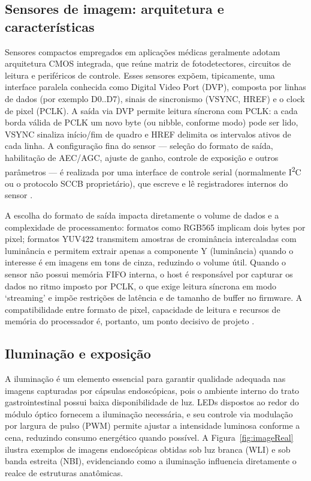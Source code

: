 \documentclass[repeatfields,xlists,xpacks,oneside]{ufrgscca}
\begin{document}
\subsection{Sensores de imagem: arquitetura e características}

Sensores compactos empregados em aplicações médicas geralmente adotam arquitetura CMOS integrada, que reúne matriz de fotodetectores, circuitos de leitura e periféricos de controle. Esses sensores expõem, tipicamente, uma interface paralela conhecida como Digital Video Port (DVP), composta por linhas de dados (por exemplo D0..D7), sinais de sincronismo (VSYNC, HREF) e o clock de pixel (PCLK). A saída via DVP permite leitura síncrona com PCLK: a cada borda válida de PCLK um novo byte (ou nibble, conforme modo) pode ser lido, VSYNC sinaliza início/fim de quadro e HREF delimita os intervalos ativos de cada linha. A configuração fina do sensor — seleção do formato de saída, habilitação de AEC/AGC, ajuste de ganho, controle de exposição e outros parâmetros — é realizada por uma interface de controle serial (normalmente I\textsuperscript{2}C ou o protocolo SCCB proprietário), que escreve e lê registradores internos do sensor \cite{cavallotti2011fpga,meng2021novel}.

A escolha do formato de saída impacta diretamente o volume de dados e a complexidade de processamento: formatos como RGB565 implicam dois bytes por pixel; formatos YUV422 transmitem amostras de crominância intercaladas com luminância e permitem extrair apenas a componente Y (luminância) quando o interesse é em imagens em tons de cinza, reduzindo o volume útil. Quando o sensor não possui memória FIFO interna, o host é responsável por capturar os dados no ritmo imposto por PCLK, o que exige leitura síncrona em modo `streaming' e impõe restrições de latência e de tamanho de buffer no firmware. A compatibilidade entre formato de pixel, capacidade de leitura e recursos de memória do processador é, portanto, um ponto decisivo de projeto \cite{cavallotti2011fpga}.

\subsection{Iluminação e exposição}

A iluminação é um elemento essencial para garantir qualidade adequada nas imagens capturadas por cápsulas endoscópicas, pois o ambiente interno do trato gastrointestinal possui baixa disponibilidade de luz. LEDs dispostos ao redor do módulo óptico fornecem a iluminação necessária, e seu controle via modulação por largura de pulso (PWM) permite ajustar a intensidade luminosa conforme a cena, reduzindo consumo energético quando possível. A Figura~\ref{fig:imageReal} ilustra exemplos de imagens endoscópicas obtidas sob luz branca (WLI) e sob banda estreita (NBI), evidenciando como a iluminação influencia diretamente o realce de estruturas anatômicas.
\end{document}
